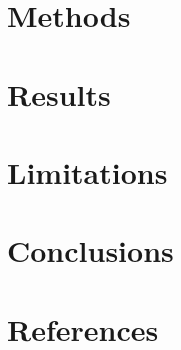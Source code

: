 \documentclass[]{article}
\begin{document}
\section{Methods}

\section{Results}

\section{Limitations}

\section{Conclusions}

\section{References}



\end{document}
